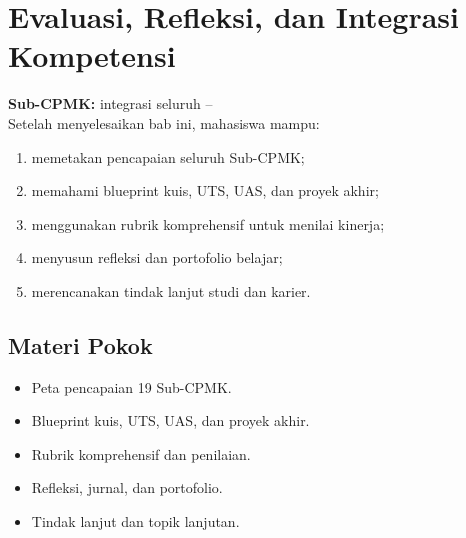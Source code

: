 \documentclass[../../main.tex]{subfiles}
\begin{document}
\chapter[Evaluasi dan Integrasi Kompetensi]{Evaluasi, Refleksi, dan Integrasi Kompetensi}
\label{chap:evaluasi}

\begin{outcomebox}
\textbf{Sub-CPMK:} integrasi seluruh --\\[3pt]
Setelah menyelesaikan bab ini, mahasiswa mampu:
\begin{enumerate}[label=\arabic*.,leftmargin=*]
  \item memetakan pencapaian seluruh Sub-CPMK;
  \item memahami blueprint kuis, UTS, UAS, dan proyek akhir;
  \item menggunakan rubrik komprehensif untuk menilai kinerja;
  \item menyusun refleksi dan portofolio belajar;
  \item merencanakan tindak lanjut studi dan karier.
\end{enumerate}
\end{outcomebox}

\section*{Materi Pokok}
\begin{itemize}[leftmargin=*]
  \item Peta pencapaian 19 Sub-CPMK.
  \item Blueprint kuis, UTS, UAS, dan proyek akhir.
  \item Rubrik komprehensif dan penilaian.
  \item Refleksi, jurnal, dan portofolio.
  \item Tindak lanjut dan topik lanjutan.
\end{itemize}















\ifSubfilesClassLoaded{%
}{}
\end{document}
